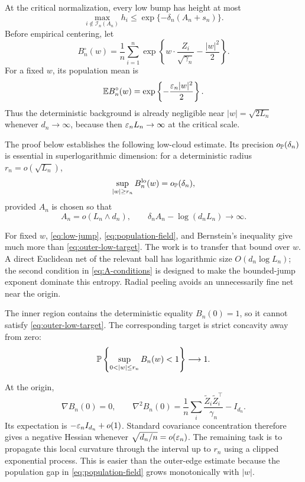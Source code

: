 At the critical normalization, every low bump has height at most
\begin{equation}
\label{eq:low-jump}
  \max_{i\notin\mathcal I_n(A_n)}h_i
  \le
  \exp\{-\delta_n(A_n+s_n)\}.
\end{equation}
Before empirical centering, let
\[
  B_n^\circ(w)
  =
  \frac1n\sum_{i=1}^n
  \exp\left\{
    w\cdot\frac{Z_i}{\sqrt{\gamma_n}}-\frac{|w|^2}{2}
  \right\}.
\]
For a fixed \(w\), its population mean is
\begin{equation}
\label{eq:population-field}
  \mathbb E B_n^\circ(w)
  =
  \exp\left\{-\frac{\varepsilon_n|w|^2}{2}\right\}.
\end{equation}
Thus the deterministic background is already negligible near
\(|w|=\sqrt{2L_n}\) whenever \(d_n\to\infty\), because then
\(\varepsilon_nL_n\to\infty\) at the critical scale.

The proof below establishes the following low-cloud estimate.  Its precision
\(o_{\mathbb P}(\delta_n)\) is essential in superlogarithmic dimension: for a
deterministic radius \(r_n=o(\sqrt{L_n})\),
\begin{equation}
\label{eq:outer-low-target}
  \sup_{|w|\ge r_n}B_n^{\rm lo}(w)
  =o_{\mathbb P}(\delta_n),
\end{equation}
provided \(A_n\) is chosen so that
\begin{equation}
\label{eq:A-conditions}
  A_n=o(L_n\wedge d_n),
  \qquad
  \delta_nA_n-\log(d_nL_n)\longrightarrow\infty.
\end{equation}

For fixed \(w\), \eqref{eq:low-jump}, \eqref{eq:population-field}, and
Bernstein's inequality give much more than \eqref{eq:outer-low-target}. The
work is to transfer that bound over \(w\). A direct Euclidean net of the
relevant ball has logarithmic size \(O(d_n\log L_n)\); the second condition
in \eqref{eq:A-conditions} is designed to make the bounded-jump exponent
dominate this entropy. Radial peeling avoids an unnecessarily fine net
near the origin.

The inner region contains the deterministic equality \(B_n(0)=1\), so it
cannot satisfy \eqref{eq:outer-low-target}.  The corresponding target is
strict concavity away from zero:
\begin{equation}
\label{eq:inner-target}
  \Pbb\left\{
    \sup_{0<|w|\le r_n}B_n(w)<1
  \right\}
  \longrightarrow1.
\end{equation}

At the origin,
\[
  \nabla B_n(0)=0,
  \qquad
  \nabla^2B_n(0)
  =
  \frac1n\sum_i
  \frac{\widetilde Z_i\widetilde Z_i^\top}{\gamma_n}
  -I_{d_n}.
\]
Its expectation is \(-\varepsilon_nI_{d_n}+o(1)\). Standard covariance concentration
therefore gives a negative Hessian whenever
\(\sqrt{d_n/n}=o(\varepsilon_n)\). The remaining task is to propagate this local
curvature through the interval up to \(r_n\) using a clipped exponential
process. This is easier than the outer-edge estimate because the population
gap in \eqref{eq:population-field} grows monotonically with \(|w|\).


